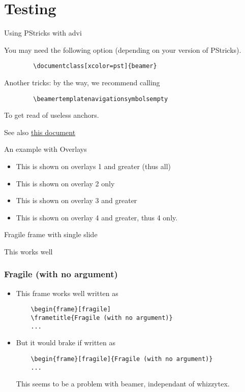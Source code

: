 \documentclass{beamer}
\begin{document}
\section{Testing}
\begin{frame}[fragile=singleslide]{Using PStricks with advi}

You may need the following option (depending on your version of PStricks). 
\begin{verbatim}
        \documentclass[xcolor=pst]{beamer}
\end{verbatim}

Another tricks: by the way, we recommend calling
\begin{verbatim}
        \beamertemplatenavigationsymbolsempty
\end{verbatim}
To get read of useless anchors.

See also 
\href{http://www.giref.ulaval.ca/~ctibirna/work/readings/beamer_pstricks.pdf}
{this document} 
\end{frame}
\begin{frame}{An example with Overlays}
\begin{itemize}
\item<1-> This is shown on overlays 1 and greater (thus all)
\item<2> This is shown on overlay 2 only
\item<3-> This is shown on overlay 3 and greater
\item<4-> This is shown on overlay 4 and greater, thus  4 only.
\end{itemize}
\end{frame}
\begin{frame}[fragile=singleslide]{Fragile frame with single slide}

This works well
\end{frame}
\begin{frame}[fragile]
\frametitle{Fragile (with no argument)}
\begin{itemize}

\item <1->
This frame works well written as
 \begin{verbatim}
    \begin{frame}[fragile]
    \frametitle{Fragile (with no argument)}
    ...
\end{verbatim}
\item <2-> 
But it would brake if written as
 \begin{verbatim}
    \begin{frame}[fragile]{Fragile (with no argument)}
    ...
\end{verbatim}
This seems to be a problem with beamer, independant of whizzytex.
\end{itemize}
\end{frame}
\end{document}
